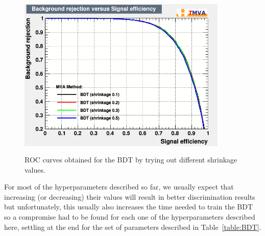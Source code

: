\documentclass[a4paper, 10pt, openright]{report}
\begin{document}
\begin{appendices}

\begin{figure}[htbp]
\centering
\includegraphics[width=10cm, height=8cm]{figs/BDT_shrinkages.png}
\caption{\ac{ROC} curves obtained for the \ac{BDT} by trying out different shrinkage values.}
\label{fig:opShrinkage}
\end{figure}

For most of the hyperparameters described so far, we usually expect that increasing (or decreasing) their values will result in better discrimination results but unfortunately, this usually also increases the time needed to train the \ac{BDT} so a compromise had to be found for each one of the hyperparameters described here, settling at the end for the set of parameters described in Table~\ref{table:BDT}.


\end{appendices}
\end{document}
